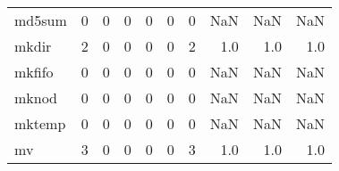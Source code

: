 \begin{longtable}{lrrrrrrrrr}
md5sum    &                                       0 &                                                  0 &                                                  0 &                                                  0 &                                                  0 &                                                  0 &                                                NaN &                                    NaN &                                  NaN \\
mkdir     &                                       2 &                                                  0 &                                                  0 &                                                  0 &                                                  0 &                                                  2 &                                                1.0 &                                    1.0 &                                  1.0 \\
mkfifo    &                                       0 &                                                  0 &                                                  0 &                                                  0 &                                                  0 &                                                  0 &                                                NaN &                                    NaN &                                  NaN \\
mknod     &                                       0 &                                                  0 &                                                  0 &                                                  0 &                                                  0 &                                                  0 &                                                NaN &                                    NaN &                                  NaN \\
mktemp    &                                       0 &                                                  0 &                                                  0 &                                                  0 &                                                  0 &                                                  0 &                                                NaN &                                    NaN &                                  NaN \\
mv        &                                       3 &                                                  0 &                                                  0 &                                                  0 &                                                  0 &                                                  3 &                                                1.0 &                                    1.0 &                                  1.0 \\

\end{longtable}
